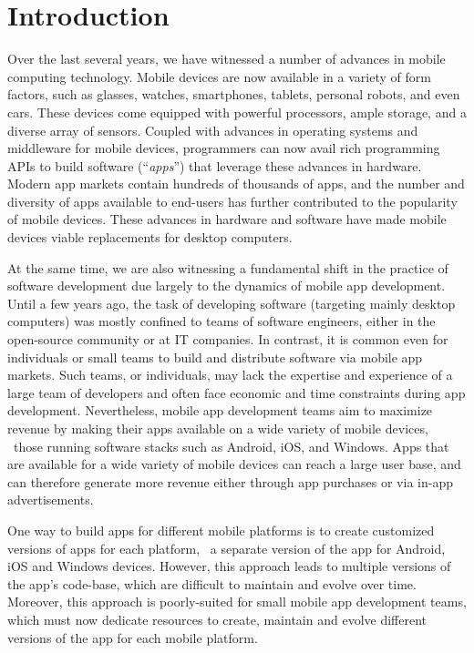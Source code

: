 \section{Introduction}
\label{section:introduction}

Over the last several years, we have witnessed a number of advances in mobile
computing technology. Mobile devices are now available in a variety of form
factors, such as glasses, watches, smartphones, tablets, personal robots, and
even cars. These devices come equipped with powerful processors, ample storage,
and a diverse array of sensors. Coupled with advances in operating systems and
middleware for mobile devices, programmers can now avail rich programming APIs
to build software (``\textit{apps}'') that leverage these advances in hardware.
Modern app markets contain hundreds of thousands of apps, and the number and
diversity of apps available to end-users has further contributed to the
popularity of mobile devices. These advances in hardware and software have made
mobile devices viable replacements for desktop computers.

At the same time, we are also witnessing a fundamental shift in the practice of
software development due largely to the dynamics of mobile app development.
Until a few years ago, the task of developing software (targeting mainly
desktop computers) was mostly confined to teams of software engineers, either
in the open-source community or at IT companies. In contrast, it is common even
for individuals or small teams to build and distribute software via mobile app
markets. Such teams, or individuals, may lack the expertise and experience of a
large team of developers and often face economic and time constraints during
app development.  Nevertheless, mobile app development teams aim to maximize
revenue by making their apps available on a wide variety of mobile devices,
\ie~those running software stacks such as Android, iOS, and Windows. Apps that
are available for a wide variety of mobile devices can reach a large user base,
and can therefore generate more revenue either through app purchases or via
in-app advertisements.

One way to build apps for different mobile platforms is to create customized
versions of apps for each platform, \eg~a separate version of the app for
Android, iOS and Windows devices. However, this approach leads to multiple
versions of the app's code-base, which are difficult to maintain and evolve
over time. Moreover, this approach is poorly-suited for small mobile app
development teams, which must now dedicate resources to create, maintain and
evolve different versions of the app for each mobile platform.

